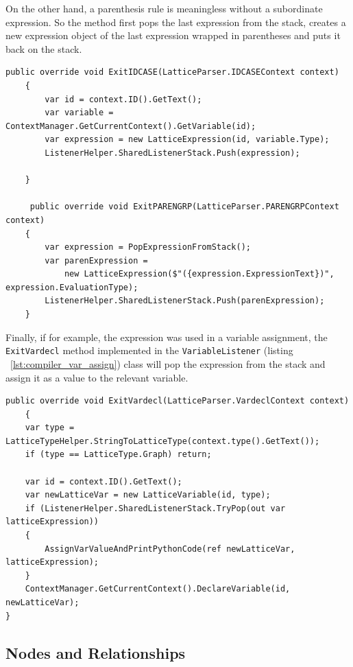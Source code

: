 On the other hand, a parenthesis rule is meaningless without a subordinate expression.
So the method first pops the last expression from the stack,
creates a new expression object of the last expression wrapped in parentheses and puts it back on the stack.

\begin{lstlisting}[caption={ExpressionListener class excerpt},captionpos=b, label={lst:expression_listener_excerpt}]
    public override void ExitIDCASE(LatticeParser.IDCASEContext context)
    {
        var id = context.ID().GetText();
        var variable = ContextManager.GetCurrentContext().GetVariable(id);
        var expression = new LatticeExpression(id, variable.Type);
        ListenerHelper.SharedListenerStack.Push(expression);

    }

     public override void ExitPARENGRP(LatticeParser.PARENGRPContext context)
    {
        var expression = PopExpressionFromStack();
        var parenExpression =
            new LatticeExpression($"({expression.ExpressionText})", expression.EvaluationType);
        ListenerHelper.SharedListenerStack.Push(parenExpression);
    }
\end{lstlisting}

Finally, if for example, the expression was used in a variable assignment, the \lstinline{ExitVardecl} method
implemented in the \lstinline{VariableListener} (listing ~\ref{lst:compiler_var_assign}) class will pop the expression from the stack and assign it
as a value to the relevant variable.

\begin{lstlisting}[caption={VariableListener class excerpt},captionpos=b, label={lst:compiler_var_assign}]
    public override void ExitVardecl(LatticeParser.VardeclContext context)
    {
    var type = LatticeTypeHelper.StringToLatticeType(context.type().GetText());
    if (type == LatticeType.Graph) return;

    var id = context.ID().GetText();
    var newLatticeVar = new LatticeVariable(id, type);
    if (ListenerHelper.SharedListenerStack.TryPop(out var latticeExpression))
    {
        AssignVarValueAndPrintPythonCode(ref newLatticeVar, latticeExpression);
    }
    ContextManager.GetCurrentContext().DeclareVariable(id, newLatticeVar);
}
\end{lstlisting}

\subsection{Nodes and Relationships} \label{subsec:nodes_and_relationships}

